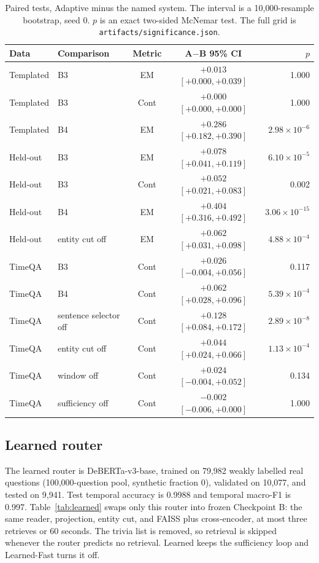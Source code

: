 \documentclass[sigconf,anonymous,review]{acmart}
\begin{document}
\begin{table}[t]
\caption{Paired tests, Adaptive minus the named system.
The interval is a 10{,}000-resample bootstrap, seed 0.
$p$ is an exact two-sided McNemar test.
The full grid is \texttt{artifacts/significance.json}.}
\label{tab:sig}
\begin{tabular}{llccr}
\toprule
Data & Comparison & Metric & A$-$B 95\% CI & $p$ \\
\midrule
Templated & B3 & EM & $+0.013$ $[+0.000,+0.039]$ & 1.000 \\
Templated & B3 & Cont & $+0.000$ $[+0.000,+0.000]$ & 1.000 \\
Templated & B4 & EM & $+0.286$ $[+0.182,+0.390]$ & $2.98\times 10^{-6}$ \\
Held-out & B3 & EM & $+0.078$ $[+0.041,+0.119]$ & $6.10\times 10^{-5}$ \\
Held-out & B3 & Cont & $+0.052$ $[+0.021,+0.083]$ & 0.002 \\
Held-out & B4 & EM & $+0.404$ $[+0.316,+0.492]$ & $3.06\times 10^{-15}$ \\
Held-out & entity cut off & EM & $+0.062$ $[+0.031,+0.098]$ & $4.88\times 10^{-4}$ \\
TimeQA & B3 & Cont & $+0.026$ $[-0.004,+0.056]$ & 0.117 \\
TimeQA & B4 & Cont & $+0.062$ $[+0.028,+0.096]$ & $5.39\times 10^{-4}$ \\
TimeQA & sentence selector off & Cont & $+0.128$ $[+0.084,+0.172]$ & $2.89\times 10^{-8}$ \\
TimeQA & entity cut off & Cont & $+0.044$ $[+0.024,+0.066]$ & $1.13\times 10^{-4}$ \\
TimeQA & window off & Cont & $+0.024$ $[-0.004,+0.052]$ & 0.134 \\
TimeQA & sufficiency off & Cont & $-0.002$ $[-0.006,+0.000]$ & 1.000 \\
\bottomrule
\end{tabular}
\end{table}

\subsection{Learned router}

The learned router is DeBERTa-v3-base, trained on 79{,}982 weakly labelled real questions (100{,}000-question pool, synthetic fraction 0), validated on 10{,}077, and tested on 9{,}941.
Test temporal accuracy is 0.9988 and temporal macro-F1 is 0.997.
Table~\ref{tab:learned} swaps only this router into frozen Checkpoint B: the same reader, projection, entity cut, and FAISS plus cross-encoder, at most three retrieves or 60 seconds.
The trivia list is removed, so retrieval is skipped whenever the router predicts no retrieval.
Learned keeps the sufficiency loop and Learned-Fast turns it off.
\end{document}
